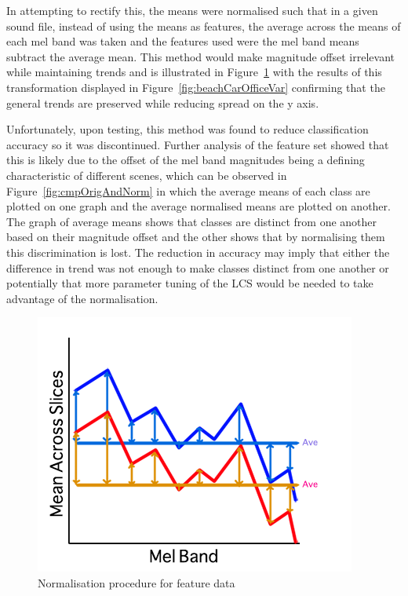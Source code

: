 \documentclass[11pt]{article}
\begin{document}
In attempting to rectify this, the means were normalised such that in a given sound file, instead of using the means as features, the average across the means of each mel band was taken and the features used were the mel band means subtract the average mean. This method would make magnitude offset irrelevant while maintaining trends and is illustrated in Figure~\ref{fig:norm} with the results of this transformation displayed in Figure~\ref{fig:beachCarOfficeVar} confirming that the general trends are preserved while reducing spread on the y axis.

Unfortunately, upon testing, this method was found to reduce classification accuracy so it was discontinued. Further analysis of the feature set showed that this is likely due to the offset of the mel band magnitudes being a defining characteristic of different scenes, which can be observed in Figure~\ref{fig:cmpOrigAndNorm} in which the average means of each class are plotted on one graph and the average normalised means are plotted on another. The graph of average means shows that classes are distinct from one another based on their magnitude offset and the other shows that by normalising them this discrimination is lost. The reduction in accuracy may imply that either the difference in trend was not enough to make classes distinct from one another or potentially that more parameter tuning of the LCS would be needed to take advantage of the normalisation.

\begin{figure}[!htbp]
	\centering
	\includegraphics[width=0.5\linewidth]{figures/normalise.png}
	\caption{Normalisation procedure for feature data}
	\label{fig:norm}
\end{figure}
\end{document}
